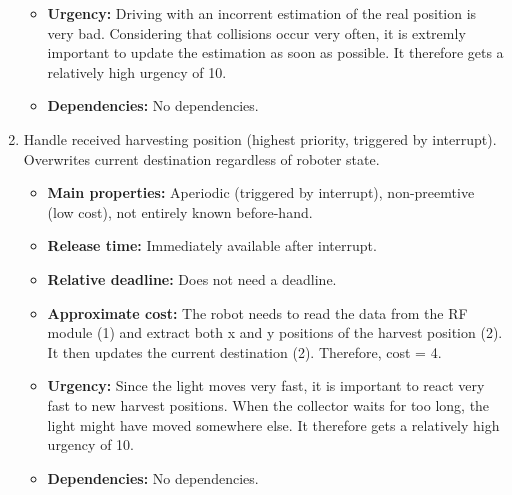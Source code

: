 \documentclass[12pt]{article}
\begin{document}
\begin{enumerate}
\begin{itemize}
  	\item \textbf{Urgency:} Driving with an incorrent estimation of the real position is very bad. Considering that collisions occur very often, it is extremly important to update the estimation as soon as possible. It therefore gets a relatively high urgency of 10.
  	\item \textbf{Dependencies:} No dependencies.
   	\end{itemize}
  \item Handle received harvesting position (highest priority, triggered by interrupt). Overwrites current destination regardless of roboter state.
  \begin{itemize}
  	\item \textbf{Main properties:} Aperiodic (triggered by interrupt), non-preemtive (low cost), not entirely known before-hand.
  	\item \textbf{Release time:} Immediately available after interrupt.
  	\item \textbf{Relative deadline:} Does not need a deadline.
  	\item \textbf{Approximate cost:} The robot needs to read the data from the RF module (1) and extract both x and y positions of the harvest position (2). It then updates the current destination (2). Therefore, cost = 4.
  	\item \textbf{Urgency:} Since the light moves very fast, it is important to react very fast to new harvest positions. When the collector waits for too long, the light might have moved somewhere else. It therefore gets a relatively high urgency of 10.
  	\item \textbf{Dependencies:} No dependencies.
   	\end{itemize}
\end{enumerate}
\end{document}
